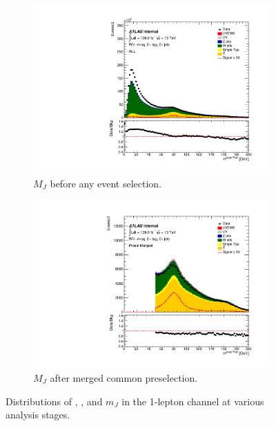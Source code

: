 \begin{figure}[ht]
        \begin{subfigure}{0.32\textwidth}
            \includegraphics[width=\linewidth]{figures/event_selection/ALL_MFatJet.pdf}
	    \caption{$M_{J}$ before any event selection.\\ \hbox{\vspace{1.5mm}}}
        \end{subfigure}
        \begin{subfigure}{0.32\textwidth}
            \includegraphics[width=\linewidth]{figures/event_selection/Presel_Merged_MFatJet.pdf}
            \caption{$M_{J}$ after merged common preselection.}
        \end{subfigure}
        \caption{Distributions of \met, \ptl, and $m_{J}$ in the 1-lepton channel at various analysis stages.}
	\label{fig:1LepPreselCuts}
\end{figure}
